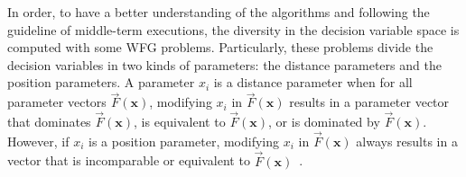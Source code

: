 In order, to have a better understanding of the algorithms and following the guideline of middle-term executions, the diversity in the decision variable space is computed with some WFG problems.
%
Particularly, these problems divide the decision variables in two kinds of parameters: the distance parameters and the position parameters.
%
A parameter $x_i$ is a distance parameter when for all parameter vectors $\vec{F}(\mathbf{x})$, modifying $x_i$ in $\vec{F}(\mathbf{x})$ results in a parameter vector that dominates $\vec{F}(\mathbf{x})$, is equivalent to $\vec{F}(\mathbf{x})$, or is dominated by $\vec{F}(\mathbf{x})$.
%
However, if $x_i$ is a position parameter, modifying $x_i$ in $\vec{F}(\mathbf{x})$ always results in a vector that is incomparable or equivalent to $\vec{F}(\mathbf{x})$~\cite{huband2005scalable}.
%

